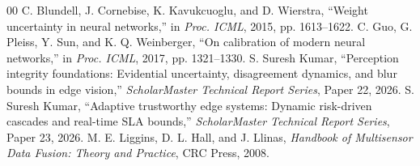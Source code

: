 \documentclass[conference]{IEEEtran}
\begin{document}
\begin{thebibliography}{00}
 C. Blundell, J. Cornebise, K. Kavukcuoglu, and D. Wierstra, ``Weight uncertainty in neural networks,'' in \emph{Proc. ICML}, 2015, pp. 1613--1622.
 C. Guo, G. Pleiss, Y. Sun, and K. Q. Weinberger, ``On calibration of modern neural networks,'' in \emph{Proc. ICML}, 2017, pp. 1321--1330.
 S. Suresh Kumar, ``Perception integrity foundations: Evidential uncertainty, disagreement dynamics, and blur bounds in edge vision,'' \emph{ScholarMaster Technical Report Series}, Paper 22, 2026.
 S. Suresh Kumar, ``Adaptive trustworthy edge systems: Dynamic risk-driven cascades and real-time SLA bounds,'' \emph{ScholarMaster Technical Report Series}, Paper 23, 2026.
 M. E. Liggins, D. L. Hall, and J. Llinas, \emph{Handbook of Multisensor Data Fusion: Theory and Practice}, CRC Press, 2008.
\end{thebibliography}
\end{document}
